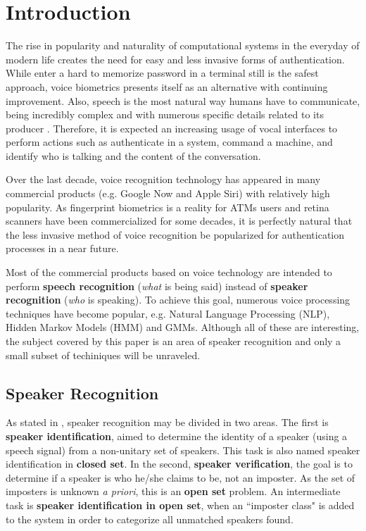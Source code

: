 \chapter{Introduction}

The rise in popularity and naturality of computational systems in the everyday of modern life creates the need for easy and less invasive forms of authentication. While enter a hard to memorize password in a terminal still is the safest approach, voice biometrics presents itself as an alternative with continuing improvement. Also, speech is the most natural way humans have to communicate, being incredibly complex and with numerous specific details related to its producer \autocite{bimbot.et.al.2004}. Therefore, it is expected an increasing usage of vocal interfaces to perform actions such as authenticate in a system, command a machine, and identify who is talking and the content of the conversation.

Over the last decade, voice recognition technology has appeared in many commercial products (e.g. Google Now and Apple Siri) with relatively high popularity. As fingerprint biometrics is a reality for ATMs users and retina scanners have been commercialized for some decades, it is perfectly natural that the less invasive method of voice recognition be popularized for authentication processes in a near future.

Most of the commercial products based on voice technology are intended to perform \textbf{speech recognition} (\emph{what} is being said) instead of \textbf{speaker recognition} (\emph{who} is speaking). To achieve this goal, numerous voice processing techniques have become popular, e.g. Natural Language Processing (NLP), Hidden Markov Models (HMM) and GMMs. Although all of these are interesting, the subject covered by this paper is an area of speaker recognition and only a small subset of techiniques will be unraveled.

\section{Speaker Recognition}

As stated in \autocite{pinheiro.2013}, speaker recognition may be divided in two areas. The first is \textbf{speaker identification}, aimed to determine the identity of a speaker (using a speech signal) from a non-unitary set of speakers. This task is also named speaker identification in \textbf{closed set}. In the second, \textbf{speaker verification}, the goal is to determine if a speaker is who he/she claims to be, not an imposter. As the set of imposters is unknown \emph{a priori}, this is an \textbf{open set} problem. An intermediate task is \textbf{speaker identification in open set}, when an ``imposter class" is added to the system in order to categorize all unmatched speakers found.

